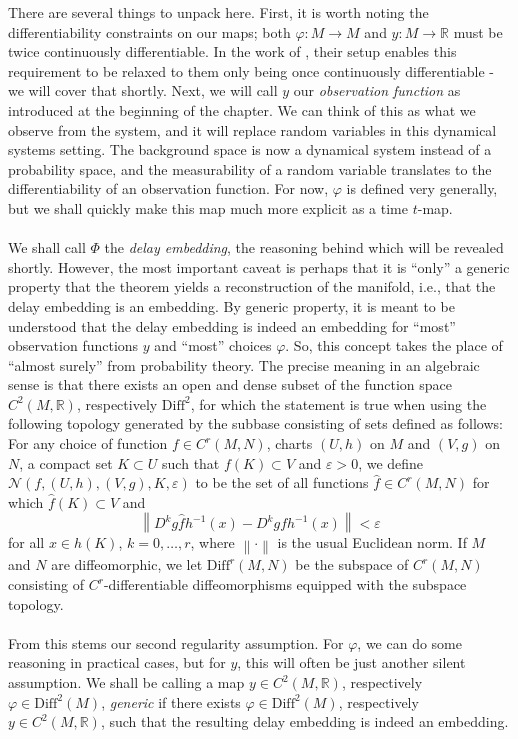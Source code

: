 \documentclass[11pt, a4paper]{memoir}
\theoremstyle{break}
\theoremstyle{break}
\theoremstyle{nonumberplain}
\newcommand{\mR}{\mathbb{R}}
\newcommand{\norm}[1]{\left\lVert#1\right\rVert}
\begin{document}
There are several things to unpack here. First, it is worth noting the differentiability constraints on our maps; both $\varphi: M\to M$ and $y:M\to\mR$ must be twice continuously differentiable. In the work of \cite{Sauer1991}, their setup enables this requirement to be relaxed to them only being once continuously differentiable - we will cover that shortly. Next, we will call $y$ our \textit{observation function} as introduced at the beginning of the chapter. We can think of this as what we observe from the system, and it will replace random variables in this dynamical systems setting. The background space is now a dynamical system instead of a probability space, and the measurability of a random variable translates to the differentiability of an observation function. For now, $\varphi$ is defined very generally, but we shall quickly make this map much more explicit as a time $t$-map.\\\\
We shall call $\Phi$ the \textit{delay embedding}, the reasoning behind which will be revealed shortly. However, the most important caveat is perhaps that it is \enquote{only} a generic property that the theorem yields a reconstruction of the manifold, i.e., that the delay embedding is an embedding. By generic property, it is meant to be understood that the delay embedding is indeed an embedding for \enquote{most} observation functions $y$ and \enquote{most} choices $\varphi$. So, this concept takes the place of \enquote{almost surely} from probability theory. The precise meaning in an algebraic sense is that there exists an open and dense subset of the function space $C^2(M,\mR)$, respectively $\text{Diff}^2$, for which the statement is true when using the following topology generated by the subbase consisting of sets defined as follows:\\[5pt]
For any choice of function $f\in C^r(M,N)$, charts $(U,h)$ on $M$ and $(V,g)$ on $N$, a compact set $K\subset U$ such that $f(K)\subset V$ and $\varepsilon>0$, we define $\mathcal{N}(f,(U,h),(V,g),K,\varepsilon)$ to be the set of all functions $\hat{f}\in C^r(M,N)$ for which $\hat{f}(K)\subset V$ and
$$\norm{D^kg\hat{f}h^{-1}(x)-D^kgfh^{-1}(x)}<\varepsilon$$
for all $x\in h(K)$, $k=0,\ldots,r$, where $\norm{\cdot}$ is the usual Euclidean norm. If $M$ and $N$ are diffeomorphic, we let $\text{Diff}^r(M,N)$ be the subspace of $C^r(M,N)$ consisting of $C^r$-differentiable diffeomorphisms equipped with the subspace topology.\\\\
From this stems our second regularity assumption. For $\varphi$, we can do some reasoning in practical cases, but for $y$, this will often be just another silent assumption. We shall be calling a map $y\in C^2(M,\mR)$, respectively $\varphi\in \text{Diff}^2(M)$, \textit{generic} if there exists $\varphi\in \text{Diff}^2(M)$, respectively $y\in C^2(M,\mR)$, such that the resulting delay embedding is indeed an embedding.
\end{document}
